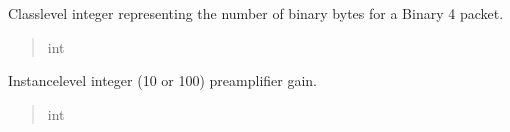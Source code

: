 \documentclass[letterpaper,10pt,english]{sphinxmanual}
\begin{document}
\begin{fulllineitems}
\begin{fulllineitems}
\end{fulllineitems}


\begin{fulllineitems}
\label{\detokenize{PodDevice_8206HR:PodDevice_8206HR.POD_8206HR.__B4BINARYLENGTH}}
\pysigstartsignatures
{}
\pysigstopsignatures
\sphinxAtStartPar
Class\sphinxhyphen{}level integer representing the number of binary bytes for a             Binary 4 packet.
\begin{quote}\begin{description}
\sphinxAtStartPar
int

\end{description}\end{quote}

\end{fulllineitems}


\begin{fulllineitems}
\label{\detokenize{PodDevice_8206HR:PodDevice_8206HR.POD_8206HR._preampGain}}
\pysigstartsignatures
{}
\pysigstopsignatures
\sphinxAtStartPar
Instance\sphinxhyphen{}level integer (10 or 100) preamplifier gain.
\begin{quote}\begin{description}
\sphinxAtStartPar
int

\end{description}\end{quote}

\end{fulllineitems}



\end{fulllineitems}
\end{document}
